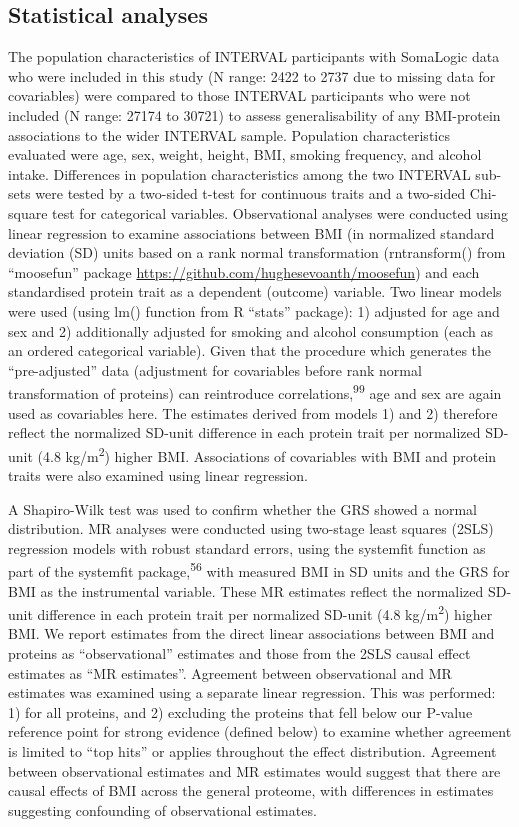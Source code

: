 \documentclass[11pt,twoside]{bristolthesis}
\begin{document}
\hypertarget{statistical-analyses}{%
\subsection{Statistical analyses}\label{statistical-analyses}}

The population characteristics of INTERVAL participants with SomaLogic data who were included in this study (N range: 2422 to 2737 due to missing data for covariables) were compared to those INTERVAL participants who were not included (N range: 27174 to 30721) to assess generalisability of any BMI-protein associations to the wider INTERVAL sample. Population characteristics evaluated were age, sex, weight, height, BMI, smoking frequency, and alcohol intake. Differences in population characteristics among the two INTERVAL sub-sets were tested by a two-sided t-test for continuous traits and a two-sided Chi-square test for categorical variables. Observational analyses were conducted using linear regression to examine associations between BMI (in normalized standard deviation (SD) units based on a rank normal transformation (rntransform() from ``moosefun'' package \url{https://github.com/hughesevoanth/moosefun}) and each standardised protein trait as a dependent (outcome) variable. Two linear models were used (using lm() function from R ``stats'' package): 1) adjusted for age and sex and 2) additionally adjusted for smoking and alcohol consumption (each as an ordered categorical variable). Given that the procedure which generates the ``pre-adjusted'' data (adjustment for covariables before rank normal transformation of proteins) can reintroduce correlations,\textsuperscript{99} age and sex are again used as covariables here. The estimates derived from models 1) and 2) therefore reflect the normalized SD-unit difference in each protein trait per normalized SD-unit (4.8 kg/m\textsuperscript{2}) higher BMI. Associations of covariables with BMI and protein traits were also examined using linear regression.

A Shapiro-Wilk test was used to confirm whether the GRS showed a normal distribution. MR analyses were conducted using two-stage least squares (2SLS) regression models with robust standard errors, using the systemfit function as part of the systemfit package,\textsuperscript{56} with measured BMI in SD units and the GRS for BMI as the instrumental variable. These MR estimates reflect the normalized SD-unit difference in each protein trait per normalized SD-unit (4.8 kg/m\textsuperscript{2}) higher BMI. We report estimates from the direct linear associations between BMI and proteins as ``observational'' estimates and those from the 2SLS causal effect estimates as ``MR estimates''. Agreement between observational and MR estimates was examined using a separate linear regression. This was performed: 1) for all proteins, and 2) excluding the proteins that fell below our P-value reference point for strong evidence (defined below) to examine whether agreement is limited to ``top hits'' or applies throughout the effect distribution. Agreement between observational estimates and MR estimates would suggest that there are causal effects of BMI across the general proteome, with differences in estimates suggesting confounding of observational estimates.
\end{document}
